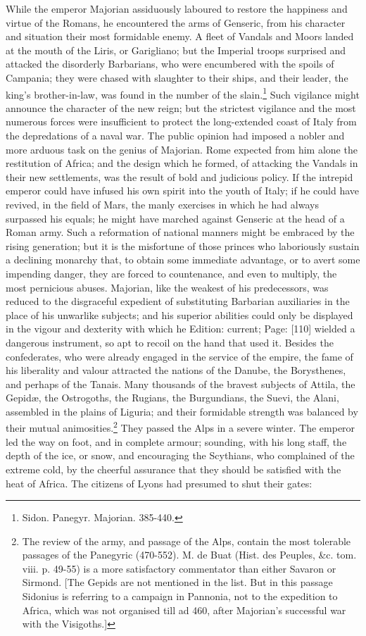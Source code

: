 While the emperor Majorian assiduously laboured to restore the happiness and virtue of the Romans, he encountered the arms of Genseric, from his character and situation their most formidable enemy. A fleet of Vandals and Moors landed at the mouth of the Liris, or Garigliano; but the Imperial troops surprised and attacked the disorderly Barbarians, who were encumbered with the spoils of Campania; they were chased with slaughter to their ships, and their leader, the king\texthebrew{}’s brother-in-law, was found in the number of the slain.\footnote{Sidon. Panegyr. Majorian. 385-440.} Such vigilance might announce the character of the new reign; but the strictest vigilance and the most numerous forces were insufficient to protect the long-extended coast of Italy from the depredations of a naval war. The public opinion had imposed a nobler and more arduous task on the genius of Majorian. Rome expected from him alone the restitution of Africa; and the design which he formed, of attacking the Vandals in their new settlements, was the result of bold and judicious policy. If the intrepid emperor could have infused his own spirit into the youth of Italy; if he could have revived, in the field of Mars, the manly exercises in which he had always surpassed his equals; he might have marched against Genseric at the head of a Roman army. Such a reformation of national manners might be embraced by the rising generation; but it is the misfortune of those princes who laboriously sustain a declining monarchy that, to obtain some immediate advantage, or to avert some impending danger, they are forced to countenance, and even to multiply, the most pernicious abuses. Majorian, like the weakest of his predecessors, was reduced to the disgraceful expedient of substituting Barbarian auxiliaries in the place of his unwarlike subjects; and his superior abilities could only be displayed in the vigour and dexterity with which he Edition: current; Page: [110] wielded a dangerous instrument, so apt to recoil on the hand that used it. Besides the confederates, who were already engaged in the service of the empire, the fame of his liberality and valour attracted the nations of the Danube, the Borysthenes, and perhaps of the Tanais. Many thousands of the bravest subjects of Attila, the Gepidæ, the Ostrogoths, the Rugians, the Burgundians, the Suevi, the Alani, assembled in the plains of Liguria; and their formidable strength was balanced by their mutual animosities.\footnote{The review of the army, and passage of the Alps, contain the most tolerable passages of the Panegyric (470-552). M. de Buat (Hist. des Peuples, \&c. tom. viii. p. 49-55) is a more satisfactory commentator than either Savaron or Sirmond. [The Gepids are not mentioned in the list. But in this passage Sidonius is referring to a campaign in Pannonia, not to the expedition to Africa, which was not organised till ad 460, after Majorian\texthebrew{}’s successful war with the Visigoths.]} They passed the Alps in a severe winter. The emperor led the way on foot, and in complete armour; sounding, with his long staff, the depth of the ice, or snow, and encouraging the Scythians, who complained of the extreme cold, by the cheerful assurance that they should be satisfied with the heat of Africa. The citizens of Lyons had presumed to shut their gates: 